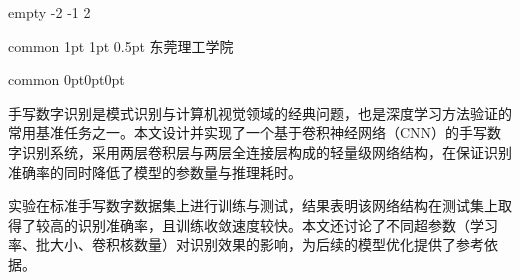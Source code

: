 \documentclass[report,oneside,UTF8,zihao=-4]{config}
\def \titlePageInfoBox{
    \infobox{6.00cm}{3}{学~~~~院}{计算机学院}\\
    \infobox{6.00cm}{3}{专~~~~业}{计算机科学与技术}\\
    \infobox{6.00cm}{3}{班~~~~级}{计科2201}\\
    \infobox{6.00cm}{3}{姓~~~~名}{张三}\\
    \infobox{6.00cm}{3}{学~~~~号}{202012345678}\\
    \infobox{5.00cm}{3}{指导教师}{李四}\\
}
\begin{document}
%
\CoverPage
    {empty} %
    {-2} %
    {-1} %
    {2} %


\Header
    {common} %
    {1pt} %
    {1pt} %
    {0.5pt} %
    {} %
    {东莞理工学院} %
    {} %

\Footer
    {common} %
    {0pt}{0pt}{0pt}
    {} %
    {\thepage} %
    {} %



\begin{abstractCN}[3]

手写数字识别是模式识别与计算机视觉领域的经典问题，也是深度学习方法验证的常用基准任务之一。本文设计并实现了一个基于卷积神经网络（CNN）的手写数字识别系统，采用两层卷积层与两层全连接层构成的轻量级网络结构，在保证识别准确率的同时降低了模型的参数量与推理耗时。

实验在标准手写数字数据集上进行训练与测试，结果表明该网络结构在测试集上取得了较高的识别准确率，且训练收敛速度较快。本文还讨论了不同超参数（学习率、批大小、卷积核数量）对识别效果的影响，为后续的模型优化提供了参考依据。

\def\keywordsCN{卷积神经网络，手写数字识别，深度学习，模式识别}

\end{abstractCN}
\end{document}
